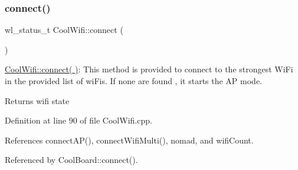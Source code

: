 \subsubsection{\texorpdfstring{connect()}{connect()}}
{\footnotesize\ttfamily wl\+\_\+status\+\_\+t Cool\+Wifi\+::connect (\begin{DoxyParamCaption}{ }\end{DoxyParamCaption})}

\hyperlink{classCoolWifi_ad060353050f40d032a2dbf9e54a768bf}{Cool\+Wifi\+::connect( )}\+: This method is provided to connect to the strongest Wi\+Fi in the provided list of wi\+Fis. If none are found , it starts the AP mode.

\begin{DoxyReturn}{Returns}
wifi state 
\end{DoxyReturn}


Definition at line 90 of file Cool\+Wifi.\+cpp.



References connect\+A\+P(), connect\+Wifi\+Multi(), nomad, and wifi\+Count.



Referenced by Cool\+Board\+::connect().


